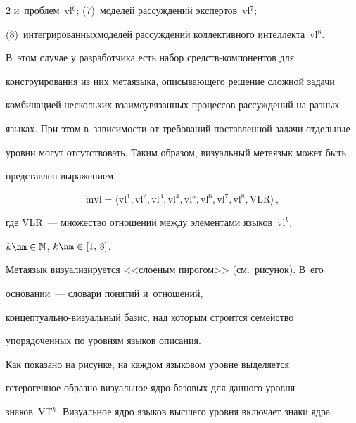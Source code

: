 \begin{multicols}{2}
и~проб\-лем~vl$^6$; (7)~моделей рассуждений экспертов~vl$^7$; 


(8)~интегрированных\linebreak моделей рассуждений коллективного интеллекта~vl$^8$. 


В~этом случае у разработчика есть набор средств-ком\-по\-нен\-тов для 


конструирования из них метаязыка, описывающего решение сложной задачи 


комбинацией нескольких взаимоувязанных процессов рассуждений на разных 


языках. При этом в~зависимости от требований поставленной задачи отдельные 


уровни могут отсутствовать. Таким образом, визуальный метаязык может быть 


представлен выражением


  \begin{equation}


\mathrm{mvl}=\langle \mathrm{vl}^1, \mathrm{vl}^2, \mathrm{vl}^3, \mathrm{vl}^4, 


\mathrm{vl}^5, \mathrm{vl}^6, \mathrm{vl}^7, \mathrm{vl}^8, \mathrm{VLR}\rangle\,,


  \label{e13-ls}


  \end{equation}


где VLR~--- множество отношений между элементами языков~vl$^k$, 


$k\hm\in \mathbb{N}$, $k\hm\in [1,\,8]$. 


  


  Метаязык визуализируется <<слоеным пирогом>> (см.\ рисунок). В~его 


основании~--- словари понятий и~отношений,  


кон\-цеп\-ту\-аль\-но-ви\-зу\-альн\-ый базис, над которым строится семейство 


упорядоченных по уровням языков описания. 


  








  Как показано на рисунке, на каждом языковом уровне выделяется 


гетерогенное об\-раз\-но-ви\-зу\-аль\-ное ядро базовых для данного уровня 


знаков~VT$^k$. Визуальное ядро языков высшего уровня включает знаки ядра 



\end{multicols}
